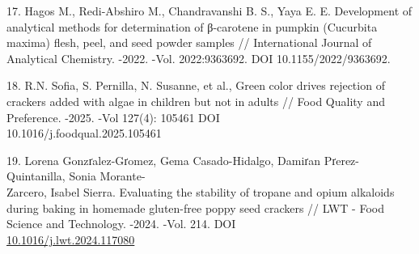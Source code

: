 \begin{references}
17. Hagos M., Redi-Abshiro M., Chandravanshi B. S., Yaya E. E.
Development of analytical methods for determination of β-carotene in
pumpkin (Cucurbita maxima) flesh, peel, and seed powder samples //
International Journal of Analytical Chemistry. -2022. -Vol.
2022:9363692. DOI 10.1155/2022/9363692.

18. R.N. Sofia, S. Pernilla, N. Susanne, et al., Green color drives
rejection of crackers added with algae in children but not in adults //
Food Quality and Preference. -2025. -Vol 127(4): 105461
DOI \\10.1016/j.foodqual.2025.105461

19. Lorena Gonzґalez-Gґomez, Gema Casado-Hidalgo, Damiґan
Pґerez-Quintanilla, Sonia Morante-\\Zarcero, Isabel Sierra. Evaluating the
stability of tropane and opium alkaloids during baking in homemade
gluten-free poppy seed crackers // LWT - Food Science and Technology.
-2024. -Vol. 214. DOI\\
\href{https://doi.org/10.1016/j.lwt.2024.117080}{10.1016/j.lwt.2024.117080}
\end{references}


